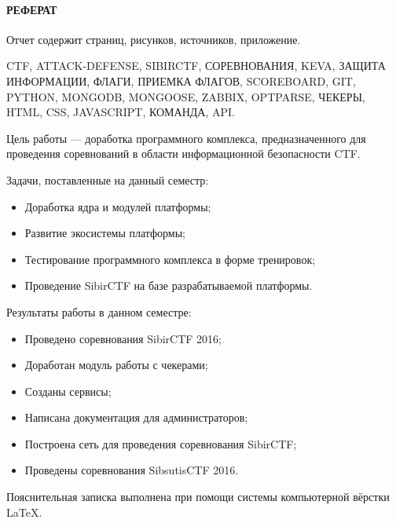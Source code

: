 \newpage
{}
\paragraph{\hfill РЕФЕРАТ \hfill}

Отчет содержит  страниц,  рисунков,  источников,  приложение.

CTF, ATTACK-DEFENSE, SIBIRCTF, СОРЕВНОВАНИЯ, KEVA, ЗАЩИТА ИНФОРМАЦИИ, ФЛАГИ, ПРИЕМКА ФЛАГОВ, SCOREBOARD, GIT, PYTHON, MONGODB, MONGOOSE, ZABBIX, OPTPARSE, ЧЕКЕРЫ, HTML, CSS, JAVASCRIPT, КОМАНДА, API.

Цель работы --- доработка программного комплекса, предназначенного для проведения соревнований в области информационной безопасности CTF.

Задачи, поставленные на данный семестр: 
\begin{itemize}
\item Доработка ядра и модулей платформы;
\item Развитие экосистемы платформы;
\item Тестирование программного комплекса в форме тренировок;
\item Проведение SibirCTF на базе разрабатываемой платформы.
\end{itemize}

Результаты работы в данном семестре:

\begin{itemize}
\item Проведено соревнования SibirCTF 2016; 
\item Доработан модуль работы с чекерами;
\item Созданы сервисы;
\item Написана документация для администраторов;
\item Построена сеть для проведения соревнования SibirCTF;
\item Проведены соревнования SibsutisCTF 2016.
\end{itemize}

Пояснительная записка выполнена при помощи системы компьютерной вёрстки \LaTeX.
